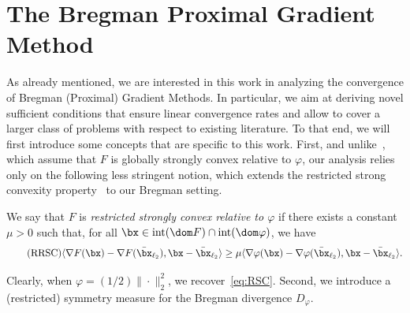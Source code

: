 \documentclass[11pt]{amsart}
\newcommand{\jc}[1]{{\color{red}#1}}
\begin{document}
\section{The Bregman Proximal Gradient Method}\label{sec:BPGM}
As already mentioned, we are interested in this work in analyzing the convergence of Bregman (Proximal) Gradient Methods. In particular,  we aim at deriving novel sufficient conditions that ensure linear convergence rates and allow to cover a larger class of problems with respect to existing literature. To that end, we will first introduce some concepts that are specific to this work. First, and unlike~\cite{lu2018relatively,Teboulle2018}, which assume that $F$ is globally strongly convex relative to $\varphi$, our analysis relies only on the following less stringent notion, which extends the restricted strong convexity property~\cite{Lai2013,necoara2019linear,zhang2015} to our Bregman setting. 

\begin{definition}\label{def:RRSC} 
We say that $F$ is \emph{restricted strongly convex relative to $\varphi$} if there exists a constant $\mu >0$ such that, for all $\bx\in\mathrm{int}(\dom F)\cap\mathrm{int}(\dom \varphi)$, we have
\begin{equation}\label{eq:rrsc}
\tag{RRSC}
\langle \nabla F(\bx)-\nabla F(\bar\bx_{\ell_2}), \bx-\bar\bx_{\ell_2}\rangle\geq \mu \langle \nabla \varphi(\bx)-\nabla \varphi(\bar\bx_{\ell_2}), \bx-\bar\bx_{\ell_2}\rangle.
\end{equation}
\end{definition}

Clearly, when $\varphi=(1/2)\|\cdot\|_2^2$, we recover~\cref{eq:RSC}.
Second, we introduce a (restricted) symmetry measure for the Bregman divergence $D_{\varphi}$.
\end{document}
